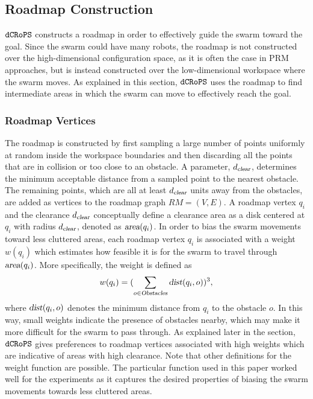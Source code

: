 \documentclass[letterpaper, 10pt, conference]{ieeeconf}
\newcommand{\Acronym}[1]{\ensuremath{{\small{\texttt{#1}}}}}
\newcommand{\Var}[1]{\ensuremath{{\small{\textsl{#1}}}}}
\newcommand{\Name}{\Acronym{dCRoPS}}
\begin{document}

\subsection{Roadmap Construction}
\label{sec:RM}

 $\Name$ constructs a roadmap in order to effectively guide the swarm
toward the goal. Since the swarm could have many robots, the roadmap
is not constructed over the high-dimensional configuration
space, as it is often the case in PRM approaches, but is instead
constructed over the low-dimensional workspace where the swarm
moves. As explained in this section, $\Name$ uses the roadmap to find
intermediate areas in which the swarm can move to effectively reach
the goal.

\subsubsection{Roadmap Vertices}
The roadmap is constructed by first sampling a large number of points
uniformly at random inside the workspace boundaries and then
discarding all the points that are in collision or too close to an
obstacle. A parameter, $d_\Var{clear}$, determines the minimum
acceptable distance from a sampled point to the nearest obstacle. The
remaining points, which are all at least $d_\Var{clear}$ units away
from the obstacles, are added as vertices to the roadmap graph $RM =
(V, E)$. A roadmap vertex $q_i$ and the clearance $d_\Var{clear}$
conceptually define a clearance area as a disk centered at $q_i$ with
radius $d_\Var{clear}$, denoted as $\Var{area}(q_i)$. In order to bias
the swarm movements toward less cluttered areas, each roadmap vertex
$q_i$ is associated with a weight $w(q_i)$ which estimates how
feasible it is for the swarm to travel through $\Var{area}(q_i)$. More
specifically, the weight is defined as
$$
w(q_i) = (\sum_{o \in \Var{Obstacles}} \Var{dist}(q_i, o))^3,
$$ 
where $\Var{dist}(q_i, o)$ denotes the minimum distance from $q_i$
to the obstacle $o$. In this way, small weights indicate the presence
of obstacles nearby, which may make it more difficult for the swarm to
pass through.  As explained later in the section, $\Name$ gives
preferences to roadmap vertices associated with high weights which are
indicative of areas with high clearance. Note that other definitions
for the weight function are possible. The particular function used in
this paper worked well for the experiments as it captures the desired
properties of biasing the swarm movements towards less cluttered
areas.
\end{document}
